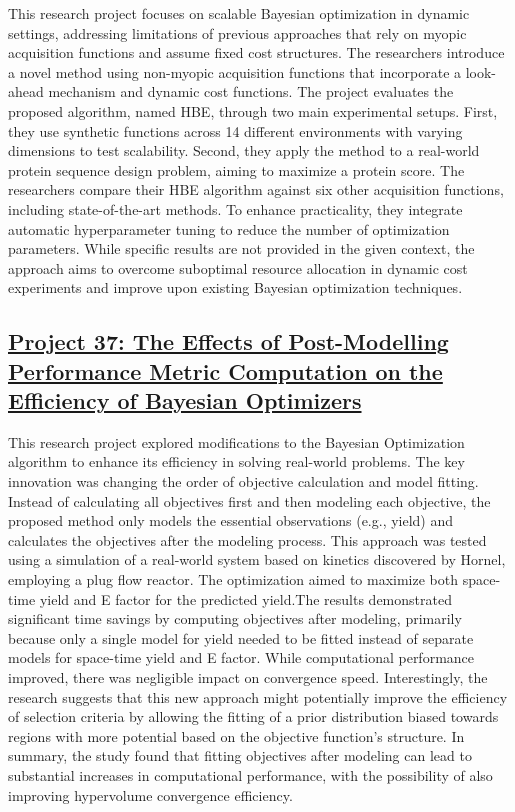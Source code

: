 This research project focuses on scalable Bayesian optimization in dynamic settings, addressing limitations of previous approaches that rely on myopic acquisition functions and assume fixed cost structures. The researchers introduce a novel method using non-myopic acquisition functions\cite{jiang_efficient_2020} that incorporate a look-ahead mechanism and dynamic cost functions. The project evaluates the proposed algorithm, named HBE, through two main experimental setups. First, they use synthetic functions across 14 different environments with varying dimensions to test scalability. Second, they apply the method to a real-world protein sequence design problem, aiming to maximize a protein score. The researchers compare their HBE algorithm against six other acquisition functions, including state-of-the-art methods. To enhance practicality, they integrate automatic hyperparameter tuning to reduce the number of optimization parameters. While specific results are not provided in the given context, the approach aims to overcome suboptimal resource allocation in dynamic cost experiments and improve upon existing Bayesian optimization techniques.
 \subsection*{\href{https://www.youtube.com/watch?v=kwXHoWV8g1E}{Project 37: The Effects of Post-Modelling Performance Metric Computation on the Efficiency of Bayesian Optimizers}}

This research project explored modifications to the Bayesian Optimization algorithm to enhance its efficiency in solving real-world problems. The key innovation was changing the order of objective calculation and model fitting. Instead of calculating all objectives first and then modeling each objective, the proposed method only models the essential observations (e.g., yield) and calculates the objectives after the modeling process. This approach was tested using a simulation of a real-world system based on kinetics discovered by Hornel, employing a plug flow reactor. The optimization aimed to maximize both space-time yield and E factor for the predicted yield.The results demonstrated significant time savings by computing objectives after modeling, primarily because only a single model for yield needed to be fitted instead of separate models for space-time yield and E factor. While computational performance improved, there was negligible impact on convergence speed. Interestingly, the research suggests that this new approach might potentially improve the efficiency of selection criteria by allowing the fitting of a prior distribution biased towards regions with more potential based on the objective function's structure. In summary, the study found that fitting objectives after modeling can lead to substantial increases in computational performance, with the possibility of also improving hypervolume convergence efficiency.
